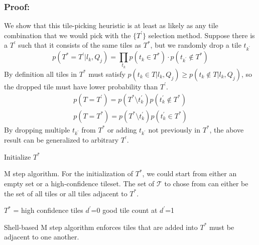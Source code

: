 \documentclass[letterpaper]{article} %
\begin{document}
\subsubsection{Proof:}
We show that this tile-picking heuristic is at least as likely as any tile combination that we would pick with the $\{T^{\prime}\}$ selection method. Suppose there is a $T^\prime$ such that it consists of the same tiles as $T^*$, but we randomly drop a tile $t_{k^\prime}$
\begin{equation}
p(T^*=T^\prime|l_k,Q_j)=\prod_{t_k} p(t_k\in T^*)\cdot p(t_{k^\prime}\notin T^*)
\end{equation}
By definition all tiles in $T^*$ must satisfy $p(t_k\in T|l_k,Q_j)\geq p(t_k\notin T|l_k,Q_j)$, so the dropped tile must have lower probability than $T^\prime$.
\begin{align}
p(T=T^\prime)=p(T^*\setminus t_k^\prime) p(t_k^\prime \notin T^*) \\
% 
% 
p(T=T^*)=p(T^*\setminus t_k^\prime) p(t_k^\prime \in T^*) 
\end{align}
By dropping multiple $t_{k^\prime}$ from $T^*$ or adding $t_{k^\prime}$ not previously in $T^*$, the above result can be generalized to arbitrary $T^\prime$.
\begin{algorithm}[ht!]
 Initialize $T^*$\;
 \caption{M step algorithm. For the initialization of $T^*$, we could start from either an empty set or a high-confidence tileset. The set of $\mathcal{T}$ to chose from can either be the set of all tiles or all tiles adjacent to $T^*$. }\label{Mstep}
\end{algorithm}

\begin{algorithm}[ht!]
 $T^*$ = high confidence tiles\;
 $d^\prime$=0\;
 good tile count at $d^\prime$=1\;
 \caption{Shell-based M step algorithm enforces tiles that are added into $T^*$ must be adjacent to one another.}\label{Mstep}
\end{algorithm}
\end{document}
